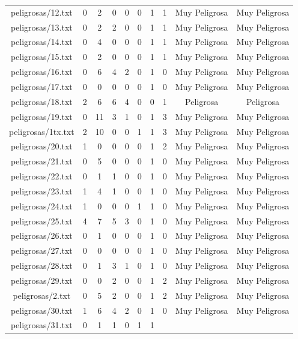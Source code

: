 \begin{table}[h]
\begin{tabular}{|c|c|c|c|c|c|c|c|c|c|}
peligrosas/12.txt
&  0
& 2
& 0
& 0
& 0
& 1
& 1
& Muy Peligrosa
& Muy Peligrosa \\
peligrosas/13.txt 
&  0
& 2
& 2
& 0
& 0
& 1
& 1
& Muy Peligrosa
& Muy Peligrosa \\
peligrosas/14.txt 
&  0
& 4
& 0
& 0
& 0
& 1
& 1
& Muy Peligrosa
& Muy Peligrosa \\
peligrosas/15.txt
&  0
& 2
& 0
& 0
& 0
& 1
& 1
& Muy Peligrosa
& Muy Peligrosa \\
peligrosas/16.txt
&  0
& 6
& 4
& 2
& 0
& 1
& 0
& Muy Peligrosa
& Muy Peligrosa \\
peligrosas/17.txt
&  0
& 0
& 0
& 0
& 0
& 1
& 0
& Muy Peligrosa
& Muy Peligrosa \\
peligrosas/18.txt
&  2
& 6
& 6
& 4
& 0
& 0
& 1
& Peligrosa
& Peligrosa  \\
peligrosas/19.txt
&  0
& 11
& 3
& 1
& 0
& 1
& 3
& Muy Peligrosa
& Muy Peligrosa \\
peligrosas/1tx.txt
&  2
& 10
& 0
& 0
& 1
& 1
& 3
& Muy Peligrosa
& Muy Peligrosa \\
peligrosas/20.txt
&  1
& 0
& 0
& 0
& 0
& 1
& 2
& Muy Peligrosa
& Muy Peligrosa \\
peligrosas/21.txt
&  0
& 5
& 0
& 0
& 0
& 1
& 0
& Muy Peligrosa
& Muy Peligrosa \\
peligrosas/22.txt
&  0
& 1
& 1
& 0
& 0
& 1
& 0
& Muy Peligrosa
& Muy Peligrosa \\
peligrosas/23.txt
&  1
& 4
& 1
& 0
& 0
& 1
& 0
& Muy Peligrosa
& Muy Peligrosa \\
peligrosas/24.txt
&  1
& 0
& 0
& 0
& 1
& 1
& 0
& Muy Peligrosa
& Muy Peligrosa \\
peligrosas/25.txt
&  4
& 7
& 5
& 3
& 0
& 1
& 0
& Muy Peligrosa
& Muy Peligrosa \\
peligrosas/26.txt
&  0
& 1
& 0
& 0
& 0
& 1
& 0
& Muy Peligrosa
& Muy Peligrosa \\
peligrosas/27.txt
&  0
& 0
& 0
& 0
& 0
& 1
& 0
& Muy Peligrosa
& Muy Peligrosa \\
peligrosas/28.txt
&  0
& 1
& 3
& 1
& 0
& 1
& 0
& Muy Peligrosa
& Muy Peligrosa \\
peligrosas/29.txt
&  0
& 0
& 2
& 0
& 0
& 1
& 2
& Muy Peligrosa
& Muy Peligrosa \\
peligrosas/2.txt
&  0
& 5
& 2
& 0
& 0
& 1
& 2
& Muy Peligrosa
& Muy Peligrosa \\
peligrosas/30.txt
&  1
& 6
& 4
& 2
& 0
& 1
& 0
& Muy Peligrosa
& Muy Peligrosa \\
peligrosas/31.txt
&  0
& 1
& 1
& 0
& 1
& 1

\end{tabular}
\end{table}
